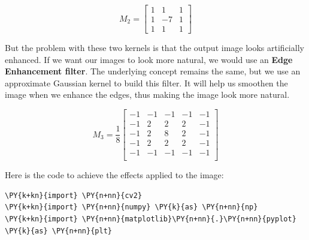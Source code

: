 \begin{center}
	\[
	\textit{$M_2$} =  
	\begin{bmatrix}
		1 & 1 & 1 \\
		1 & -7 & 1 \\
		1 & 1 & 1
	\end{bmatrix}
	\]
\end{center}

But the problem with these two kernels is that the output image looks artificially enhanced. If we want our images to look more natural, we would use an \textbf{Edge Enhancement filter}. The underlying concept remains the same, but we use an approximate Gaussian kernel to build this filter. It will help us smoothen the image when we enhance the edges, thus making the image look more natural. 

\begin{center}
	\[
	\textit{$M_3$} = \frac{1}{8} 
	\begin{bmatrix}
		-1 & -1 & -1 & -1 & -1 \\
		-1 &  2 &  2 &  2 & -1 \\
		-1 &  2 &  8 &  2 & -1 \\
		-1 &  2 &  2 &  2 & -1 \\
		-1 & -1 & -1 & -1 & -1 \\
	\end{bmatrix}
	\]
\end{center}

Here is the code to achieve the effects applied to the image:

\vspace{0.5cm}

\begin{tcolorbox}[breakable, size=fbox, boxrule=1pt, pad at break*=1mm,colback=cellbackground, colframe=cellborder]
	\begin{Verbatim}[commandchars=\\\{\}]
\PY{k+kn}{import} \PY{n+nn}{cv2}
\PY{k+kn}{import} \PY{n+nn}{numpy} \PY{k}{as} \PY{n+nn}{np}
\PY{k+kn}{import} \PY{n+nn}{matplotlib}\PY{n+nn}{.}\PY{n+nn}{pyplot} \PY{k}{as} \PY{n+nn}{plt}
	\end{Verbatim}
\end{tcolorbox}


